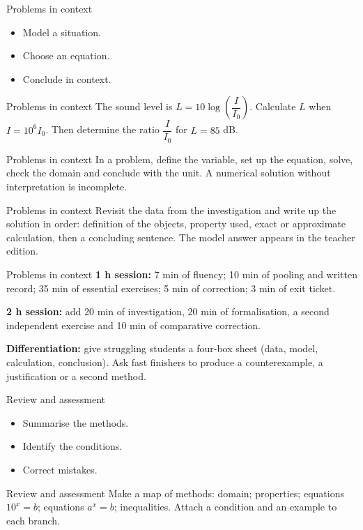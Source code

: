 \documentclass[aspectratio=169,10pt]{beamer}
\begin{document}
\begin{frame}{Problems in context}
\begin{itemize}
\item Model a situation.
\item Choose an equation.
\item Conclude in context.

\end{itemize}
\end{frame}
\begin{frame}{Problems in context}
The sound level is \(L=10\log\!\left(\dfrac I{I_0}\right)\). Calculate \(L\) when \(I=10^6I_0\). Then determine the ratio \(\dfrac I{I_0}\) for \(L=85\) dB.
\end{frame}
\begin{frame}{Problems in context}
In a problem, define the variable, set up the equation, solve, check the domain and conclude with the unit. A numerical solution without interpretation is incomplete.
\end{frame}
\begin{frame}{Problems in context}
Revisit the data from the investigation and write up the solution in order: definition of the objects, property used, exact or approximate calculation, then a concluding sentence. The model answer appears in the teacher edition.
\end{frame}
\begin{frame}{Problems in context}
\textbf{1 h session:} 7 min of fluency; 10 min of pooling and written record; 35 min of essential exercises; 5 min of correction; 3 min of exit ticket.

\textbf{2 h session:} add 20 min of investigation, 20 min of formalisation, a second independent exercise and 10 min of comparative correction.

\textbf{Differentiation:} give struggling students a four-box sheet (data, model, calculation, conclusion). Ask fast finishers to produce a counterexample, a justification or a second method.
\end{frame}
\begin{frame}{Review and assessment}
\begin{itemize}
\item Summarise the methods.
\item Identify the conditions.
\item Correct mistakes.

\end{itemize}
\end{frame}
\begin{frame}{Review and assessment}
Make a map of methods: domain; properties; equations \(10^x=b\); equations \(a^x=b\); inequalities. Attach a condition and an example to each branch.
\end{frame}
\end{document}
